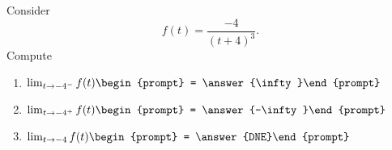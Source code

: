\documentclass{ximera}
\author{Bart Snapp}
\begin{document}
\begin{exercise}
Consider 
\[
f(t) = \frac{-4}{(t+4)^3}.
\]
Compute
\begin{enumerate}
\item $\lim_{t\to -4^- } f(t) \begin{prompt} = \answer{\infty}\end{prompt}$
\item $\lim_{t\to -4^+ } f(t) \begin{prompt} = \answer{-\infty}\end{prompt}$
\item $\lim_{t\to -4 } f(t) \begin{prompt} = \answer{DNE}\end{prompt}$
\end{enumerate}
\end{exercise}
\end{document}

